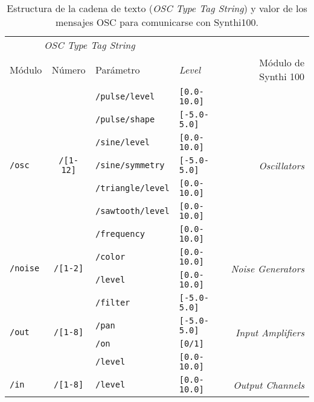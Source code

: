 \begin{table}
	\begin{center}
		\begin{tabular}{ lcllr }
			\multicolumn{3}{c}{\textit{OSC Type Tag String}} \\
			\cline{1-3}
			Módulo			& Número			& Parámetro				& \textit{Level} 	& Módulo de Synthi 100 \\
			
			\hline 
			\multirow{7}{*}{\texttt{/osc}}	& \multirow{7}{*}{\texttt{/[1-12]}}	& \texttt{/pulse/level}	&\texttt{[0.0-10.0]} & \multirow{7}{*}{\textit{Oscillators}}\\
			& & \texttt{/pulse/shape} & \texttt{[-5.0-5.0]} & \\
			& & \texttt{/sine/level} & \texttt{[0.0-10.0]} & \\
			& & \texttt{/sine/symmetry} & \texttt{[-5.0-5.0]} &\\
			& & \texttt{/triangle/level} & \texttt{[0.0-10.0]}  &\\
			& & \texttt{/sawtooth/level} & \texttt{[0.0-10.0]} &\\
			& & \texttt{/frequency} & \texttt{[0.0-10.0]} &\\
			
			\hline
			\multirow{2}{*}{\texttt{/noise}}	& \multirow{2}{*}{\texttt{/[1-2]}}	& \texttt{/color}	&\texttt{[0.0-10.0]} & \multirow{2}{*}{\textit{Noise Generators}}\\
			& & \texttt{/level} &\texttt{[0.0-10.0]}& \\
			\hline
			
			\multirow{4}{*}{\texttt{/out}}	& \multirow{4}{*}{\texttt{/[1-8]}}	& \texttt{/filter}	&\texttt{[-5.0-5.0]} & \multirow{4}{*}{\textit{Input Amplifiers}}\\
			& & \texttt{/pan} & \texttt{[-5.0-5.0]} & \\
			& & \texttt{/on} & \texttt{[0/1]} & \\
			& & \texttt{/level} & \texttt{[0.0-10.0]} &\\
			\hline
			
			\multirow{1}{*}{\texttt{/in}}	& \multirow{1}{*}{\texttt{/[1-8]}}	& \texttt{/level}	&\texttt{[0.0-10.0]} & \multirow{1}{*}{\textit{Output Channels}}\\
			\hline
			
		\end{tabular}
		\caption[Estructura de los mensajes OSC]{Estructura de la cadena de texto (\textit{OSC Type Tag String}) y valor de los mensajes OSC para comunicarse con Synthi100.}
		\label{table:osc}
	\end{center}
\end{table}